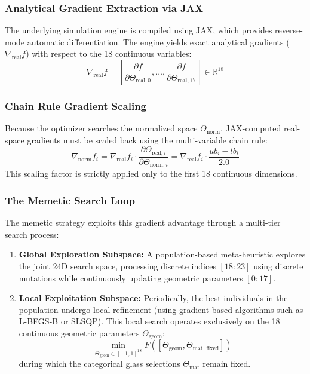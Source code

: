 \documentclass[12pt]{article}
\begin{document}
\subsubsection{Analytical Gradient Extraction via JAX}
The underlying simulation engine is compiled using JAX, which provides reverse-mode automatic differentiation. The engine yields exact analytical gradients ($\nabla_{\text{real}} f$) with respect to the 18 continuous variables:
\[ \nabla_{\text{real}} f = \left[ \frac{\partial f}{\partial \Theta_{\text{real}, 0}}, \dots, \frac{\partial f}{\partial \Theta_{\text{real}, 17}} \right] \in \mathbb{R}^{18} \]

\subsubsection{Chain Rule Gradient Scaling}
Because the optimizer searches the normalized space $\Theta_{\text{norm}}$, JAX-computed real-space gradients must be scaled back using the multi-variable chain rule:
\[ \nabla_{\text{norm}} f_i = \nabla_{\text{real}} f_i \cdot \frac{\partial \Theta_{\text{real}, i}}{\partial \Theta_{\text{norm}, i}} = \nabla_{\text{real}} f_i \cdot \frac{ub_i - lb_i}{2.0} \]
This scaling factor is strictly applied only to the first 18 continuous dimensions.

\subsubsection{The Memetic Search Loop}
The memetic strategy exploits this gradient advantage through a multi-tier search process:
\begin{enumerate}
    \item \textbf{Global Exploration Subspace:} A population-based meta-heuristic explores the joint 24D search space, processing discrete indices $[18:23]$ using discrete mutations while continuously updating geometric parameters $[0:17]$.
    \item \textbf{Local Exploitation Subspace:} Periodically, the best individuals in the population undergo local refinement (using gradient-based algorithms such as L-BFGS-B or SLSQP). This local search operates exclusively on the 18 continuous geometric parameters $\Theta_{\text{geom}}$:
    \[ \min_{\Theta_{\text{geom}} \in [-1, 1]^{18}} F\left([\Theta_{\text{geom}}, \Theta_{\text{mat, fixed}}]\right) \]
    during which the categorical glass selections $\Theta_{\text{mat}}$ remain fixed.
\end{enumerate}
\end{document}
